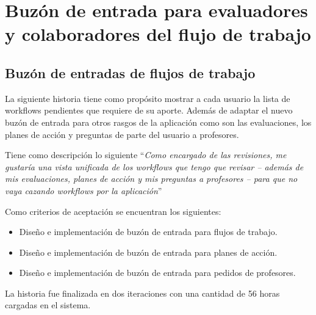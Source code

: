 \section{Buzón de entrada para evaluadores y colaboradores del flujo de trabajo}
\begin{table}[H]
\centering
{}
\caption{Historias de usuario para el buzón de entrada para evaluadores y colaboradores del flujo de trabajo}
\label{epic:4}
\end{table}

\subsection{Buzón de entradas de flujos de trabajo}
La siguiente historia tiene como propósito mostrar a cada usuario la lista de workflows pendientes que requiere de su aporte. Además de adaptar el nuevo buzón de entrada para otros rasgos de la aplicación como son las evaluaciones, los planes de acción y preguntas de parte del usuario a profesores.

Tiene como descripción lo siguiente \enquote{\textit{Como encargado de las revisiones, me gustaría una vista unificada de los workflows que tengo que revisar – además de mis evaluaciones, planes de acción y mis preguntas a profesores – para que no vaya cazando workflows por la aplicación}}

Como criterios de aceptación se encuentran los siguientes:
\begin{itemize}
	\item Diseño e implementación de buzón de entrada para flujos de trabajo.
	\item Diseño e implementación de buzón de entrada para planes de acción.
	\item Diseño e implementación de buzón de entrada para pedidos de profesores.
\end{itemize}

La historia fue finalizada en dos iteraciones con una cantidad de 56 horas cargadas en el sistema.

